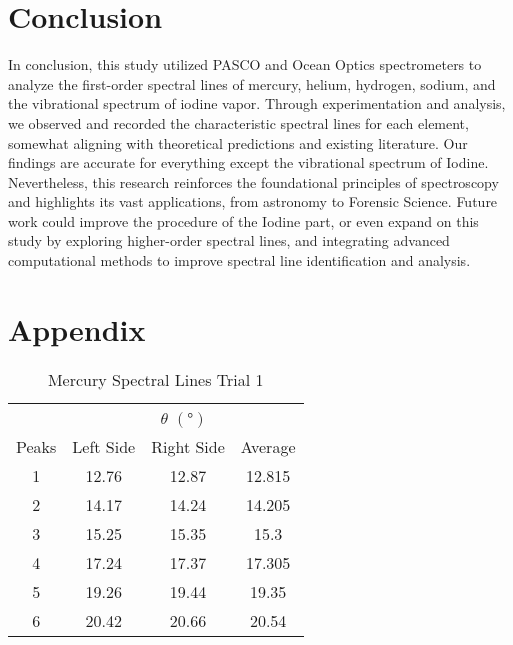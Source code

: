\documentclass[12pt]{article}
\begin{document}
	\section{Conclusion}
	
	In conclusion, this study utilized PASCO and Ocean Optics spectrometers to analyze the first-order spectral lines of mercury, helium, hydrogen, sodium, and the vibrational spectrum of iodine vapor. Through experimentation and analysis, we observed and recorded the characteristic spectral lines for each element, somewhat aligning with theoretical predictions and existing literature. Our findings are accurate for everything except the vibrational spectrum of Iodine. Nevertheless, this research reinforces the foundational principles of spectroscopy and highlights its vast applications, from astronomy to Forensic Science. Future work could improve the procedure of the Iodine part, or even expand on this study by exploring higher-order spectral lines, and integrating advanced computational methods to improve spectral line identification and analysis.

\clearpage

	\section{Appendix}
	
	
	\begin{table}[htbp]
		\centering
		\caption{Mercury Spectral Lines Trial 1}
		\label{tab:MercurySpectralLinesTrial1}
		\begin{tabular}{@{}cccc@{}}
			\toprule
			& \multicolumn{3}{c}{$\theta$ $(\unit{\degree})$}                             \\ \cmidrule(lr){2-4}
			\multicolumn{1}{l}{Peaks} & Left Side     & Right Side     & \multicolumn{1}{l}{Average} \\ \midrule
			1                         & 12.76         & 12.87          & 12.815                      \\
			2                         & 14.17         & 14.24          & 14.205                      \\
			3                         & 15.25         & 15.35          & 15.3                        \\
			4                         & 17.24         & 17.37          & 17.305                      \\
			5                         & 19.26         & 19.44          & 19.35                       \\
			6                         & 20.42         & 20.66          & 20.54                       \\ \bottomrule
		\end{tabular}
	\end{table}
	
\end{document}
